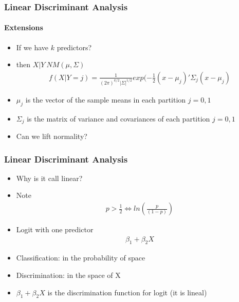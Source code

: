 \documentclass[
  shownotes,
  xcolor={svgnames},
  hyperref={colorlinks,citecolor=DarkBlue,linkcolor=DarkRed,urlcolor=DarkBlue}
  , aspectratio=169]{beamer}
\begin{document}
\begin{frame}[fragile]
\frametitle{Linear Discriminant Analysis}
\framesubtitle{Extensions}

\begin{itemize}
    \item If we have $k$ predictors?
    \medskip
    \item then $X|Y~NM(\mu,\Sigma)$
    \begin{align}
    f(X|Y=j) = \frac{1}{(2\pi)^{k/2}|\Sigma|^{1/2}}exp(-\frac{1}{2}(x-\mu_j)'\Sigma_j(x-\mu_j)
    \end{align}
    \item $\mu_j$ is the vector of the sample means in each partition $j=0,1$
    \medskip
    \item $\Sigma_j$ is the matrix of variance and covariances of each partition $j=0,1$
    \medskip
    \item Can we lift normality? 
    \end{itemize}
\end{frame}
\begin{frame}[fragile]
\frametitle{Linear Discriminant Analysis}

\begin{itemize}
  \item Why is it call linear?
  \item Note
  \begin{align}
    p>\frac{1}{2} \iff ln(\frac{p}{(1-p)})
  \end{align}
  \item Logit with one predictor
  \begin{align}
  \beta_1 + \beta_2 X
  \end{align}
  \item Classification: in the probability of space
  \item Discrimination: in the space of X
  \item $\beta_1 +\beta_2 X$ is the discrimination function for logit (it is lineal)
\end{itemize}

\end{frame}
\end{document}

